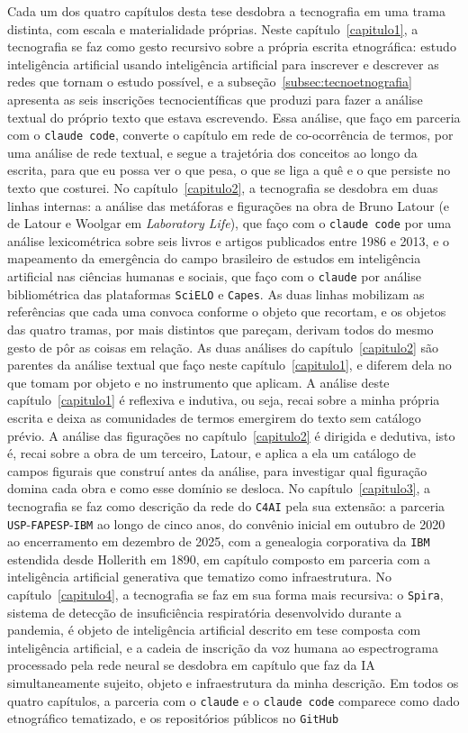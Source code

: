 Cada um dos quatro capítulos desta tese desdobra a tecnografia em uma trama distinta, com escala e materialidade próprias. Neste capítulo~\ref{capitulo1}, a tecnografia se faz como gesto recursivo sobre a própria escrita etnográfica: estudo inteligência artificial usando inteligência artificial para inscrever e descrever as redes que tornam o estudo possível, e a subseção~\ref{subsec:tecnoetnografia} apresenta as seis inscrições tecnocientíficas que produzi para fazer a análise textual do próprio texto que estava escrevendo. Essa análise, que faço em parceria com o \texttt{claude code}, converte o capítulo em rede de co-ocorrência de termos, por uma análise de rede textual, e segue a trajetória dos conceitos ao longo da escrita, para que eu possa ver o que pesa, o que se liga a quê e o que persiste no texto que costurei. No capítulo~\ref{capitulo2}, a tecnografia se desdobra em duas linhas internas: a análise das metáforas e figurações na obra de Bruno Latour (e de Latour e Woolgar em \emph{Laboratory Life}), que faço com o \texttt{claude code} por uma análise lexicométrica sobre seis livros e artigos publicados entre 1986 e 2013, e o mapeamento da emergência do campo brasileiro de estudos em inteligência artificial nas ciências humanas e sociais, que faço com o \texttt{claude} por análise bibliométrica das plataformas \texttt{SciELO} e \texttt{Capes}. As duas linhas mobilizam as referências que cada uma convoca conforme o objeto que recortam, e os objetos das quatro tramas, por mais distintos que pareçam, derivam todos do mesmo gesto de pôr as coisas em relação. As duas análises do capítulo~\ref{capitulo2} são parentes da análise textual que faço neste capítulo~\ref{capitulo1}, e diferem dela no que tomam por objeto e no instrumento que aplicam. A análise deste capítulo~\ref{capitulo1} é reflexiva e indutiva, ou seja, recai sobre a minha própria escrita e deixa as comunidades de termos emergirem do texto sem catálogo prévio. A análise das figurações no capítulo~\ref{capitulo2} é dirigida e dedutiva, isto é, recai sobre a obra de um terceiro, Latour, e aplica a ela um catálogo de campos figurais que construí antes da análise, para investigar qual figuração domina cada obra e como esse domínio se desloca. No capítulo~\ref{capitulo3}, a tecnografia se faz como descrição da rede do \texttt{C4AI} pela sua extensão: a parceria \texttt{USP}-\texttt{FAPESP}-\texttt{IBM} ao longo de cinco anos, do convênio inicial em outubro de 2020 ao encerramento em dezembro de 2025, com a genealogia corporativa da \texttt{IBM} estendida desde Hollerith em 1890, em capítulo composto em parceria com a inteligência artificial generativa que tematizo como infraestrutura. No capítulo~\ref{capitulo4}, a tecnografia se faz em sua forma mais recursiva: o \texttt{Spira}, sistema de detecção de insuficiência respiratória desenvolvido durante a pandemia, é objeto de inteligência artificial descrito em tese composta com inteligência artificial, e a cadeia de inscrição da voz humana ao espectrograma processado pela rede neural se desdobra em capítulo que faz da IA simultaneamente sujeito, objeto e infraestrutura da minha descrição. Em todos os quatro capítulos, a parceria com o \texttt{claude} e o \texttt{claude code} comparece como dado etnográfico tematizado, e os repositórios públicos no \texttt{GitHub} 